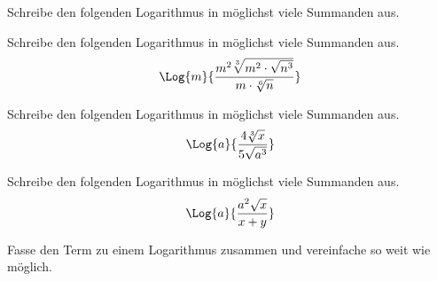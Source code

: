 \documentclass[11pt]{exam}
\begin{document}
\begin{questions}


\question[6]
Schreibe den folgenden Logarithmus in möglichst viele Summanden aus.

\question[2]
Schreibe den folgenden Logarithmus in möglichst viele Summanden aus.
\[\Log{m}{\frac{m^2\sqrt[3]{m^2\*\sqrt{n^3}}}{m\*\sqrt[6]{n}}}\]

\question[2]
Schreibe den folgenden Logarithmus in möglichst viele Summanden aus. \[\Log{a}{\frac{4\sqrt[3]{x}}{5\sqrt{a^3}}}\]

\question[2]
Schreibe den folgenden Logarithmus in möglichst viele Summanden aus. \[\Log{a}{\frac{a^2\sqrt{x}}{x+y}}\]


\question[6]
Fasse den Term zu einem Logarithmus zusammen und vereinfache so weit wie möglich.
\begin{parts}

\end{parts}
\end{questions}
\end{document}
